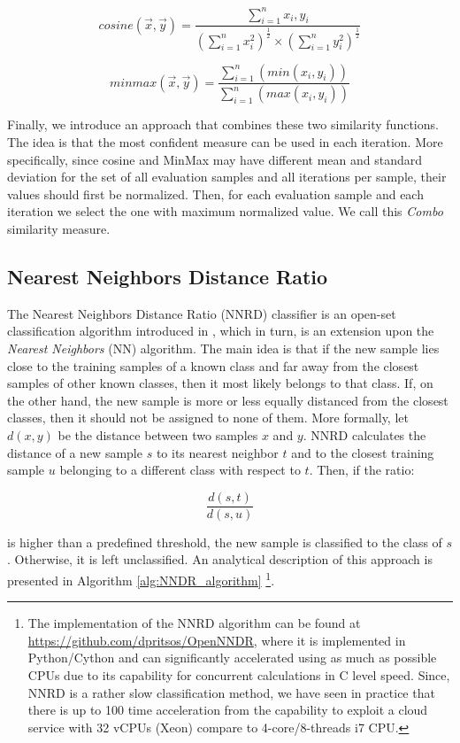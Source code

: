 \begin{equation}
\label{eq:cosine}
cosine(\vec{x},\vec{y})= \frac{\displaystyle \sum_{i=1}^{n} x_i,y_i}{(\displaystyle \sum_{i=1}^{n} x_i^2)^\frac{1}{2}×(\displaystyle \sum_{i=1}^{n} y_i^2)^\frac{1}{2}}
\end{equation}

\begin{equation}
\label{eq:minmax}
minmax(\vec{x},\vec{y})=\frac{\displaystyle \sum_{i=1}^{n}(min(x_i,y_i))}{\displaystyle \sum_{i=1}^{n} (max(x_i,y_i))}	\end{equation}

Finally, we introduce an approach that combines these two similarity functions. The idea is that the most confident measure can be used in each iteration. More specifically, since cosine and MinMax may have different mean and standard deviation for the set of all evaluation samples and all iterations per sample, their values should first be normalized. Then, for each evaluation sample and each iteration we select the one with maximum normalized value. We call this \textit{Combo} similarity measure.

\subsection{Nearest Neighbors Distance Ratio}\label{chap:openset:sec:NNRD_Description}

The Nearest Neighbors Distance Ratio (NNRD) classifier is an open-set classification algorithm introduced in , which in turn, is an extension upon the \textit{Nearest Neighbors} (NN) algorithm. The main idea is that if the new sample lies close to the training samples of a known class and far away from the closest samples of other known classes, then it most likely belongs to that class. If, on the other hand, the new sample is more or less equally distanced from the closest classes, then it should not be assigned to none of them. More formally, let $d(x,y)$ be the distance between two samples $x$ and $y$. NNRD calculates the distance of a new sample $s$ to its nearest neighbor $t$ and to the closest training sample $u$ belonging to a different class with respect to $t$. Then, if the ratio: 

\begin{equation}
    \frac{d(s,t)}{d(s,u)}
\end{equation}

\nointend is higher than a predefined threshold, the new sample is classified to the class of $s$. Otherwise, it is left unclassified. An analytical description of this approach is presented in Algorithm \ref{alg:NNDR_algorithm} \footnote{The implementation of the NNRD algorithm can be found at \url{https://github.com/dpritsos/OpenNNDR}, where it is implemented in Python/Cython and can significantly accelerated using as much as possible CPUs due to its capability for concurrent calculations in C level speed. Since, NNRD is a rather slow classification method, we have seen in practice that there is up to 100 time acceleration from the capability to exploit a cloud service with 32 vCPUs (Xeon) compare to 4-core/8-threads i7 CPU.}. 

